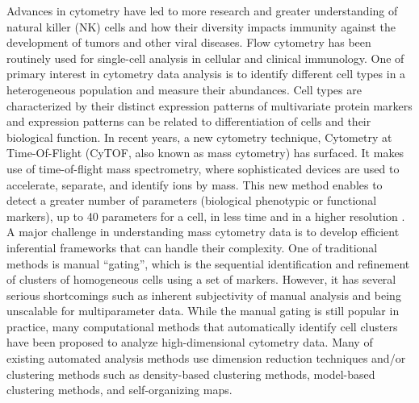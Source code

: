 \documentclass[12pt,]{article}
\begin{document}
Advances in cytometry have led to more research and greater understanding  of
natural killer (NK) cells and how their diversity impacts immunity against the
development of tumors and other viral diseases.  Flow cytometry has been routinely used for single-cell analysis in cellular and clinical immunology. One of primary interest in cytometry data analysis is to identify different cell types in a heterogeneous population and measure their abundances.  Cell types are characterized by their distinct expression patterns of multivariate protein markers and expression patterns can be related to differentiation of cells and their biological function.  
In recent years, a new cytometry technique, Cytometry at Time-Of-Flight (CyTOF, also known as mass cytometry) has surfaced.
It makes use of time-of-flight mass spectrometry, where sophisticated devices
are used to accelerate, separate, and identify ions by mass. This new method
enables to detect a greater number of parameters (biological phenotypic or functional markers), up to 40 parameters for a cell, in less time and in a higher resolution
\citep{cheung2011screening}. 
A major challenge in understanding mass cytometry data is to develop efficient
inferential frameworks that can handle their complexity. One of traditional methods is manual ``gating'', which is the sequential identification and refinement of clusters of homogeneous cells using a set of markers. However, it has several serious shortcomings such as inherent subjectivity of manual analysis and being unscalable for multiparameter data. While the manual gating is still popular in practice, many computational methods that automatically identify cell clusters have been proposed to analyze high-dimensional cytometry data.  
Many of existing automated analysis methods use dimension reduction techniques and/or
clustering methods such as density-based clustering methods, model-based clustering methods, and self-organizing maps.
\end{document}
